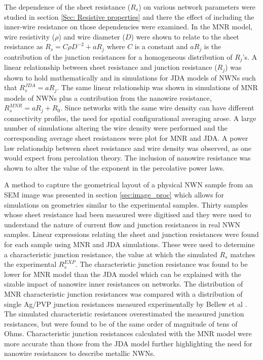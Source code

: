 The dependence of the sheet resistance ($R_s$) on various network parameters were studied in section \ref{Sec: Resistive properties} and there the effect of including the inner-wire resistance on those dependencies were examined. In the MNR model, wire resistivity ($\rho$) and wire diameter ($D$) were shown to relate to the sheet resistance as $R_s = C \rho D^{-2} + a R_j$ where $C$ is a constant and $a R_j$ is the contribution of the junction resistances for a homogeneous distribution of $R_j$'s. A linear relationship between sheet resistance and junction resistance ($R_j$) was shown to hold mathematically and in simulations for JDA models of NWNs such that $R_s^{JDA} = a R_j$. The same linear relationship was shown in simulations of MNR models of NWNs plus a contribution from the nanowire resistance, $R_s^{MNR}=a R_j + R_0$. Since networks with the same wire density can have different connectivity profiles, the need for spatial configurational averaging arose. A large number of simulations altering the wire density were performed and the corresponding average sheet resistances were plot for MNR and JDA. A power law relationship between sheet resistance and wire density was observed, as one would expect from percolation theory. The inclusion of nanowire resistance was shown to alter the value of the exponent in the percolative power laws.

A method to capture the geometrical layout of a physical NWN sample from an SEM image was presented in section \ref{sec:image_proc} which allows for simulations on geometries similar to the experimental samples. Thirty samples whose sheet resistance had been measured were digitised and they were used to understand the nature of current flow and junction resistances in real NWN samples. Linear expressions relating the sheet and junction resistances were found for each sample using MNR and JDA simulations. These were used to determine a characteristic junction resistance, the value at which the simulated $R_s$ matches the experimental $R_s^{EXP}$. The characteristic junction resistance was found to be lower for MNR model than the JDA model which can be explained with the sizable impact of nanowire inner resistances on networks. The distribution of MNR characteristic junction resistances was compared with a distribution of single Ag/PVP junction resistances measured experimentally by Bellew et al \cite{bellew2015}. The simulated characteristic resistances overestimated the measured junction resistances, but were found to be of the same order of magnitude of tens of Ohms. Characteristic junction resistances calculated with the MNR model were more accurate than those from the JDA model further highlighting the need for nanowire resistances to describe metallic NWNs.

